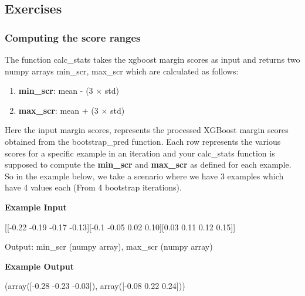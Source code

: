 \documentclass[11pt]{article}
\providecommand{\tightlist}{%
      \setlength{\itemsep}{0pt}\setlength{\parskip}{0pt}}
\newenvironment{Shaded}{}{}
\newcommand{\FloatTok}[1]{\textcolor[rgb]{0.25,0.63,0.44}{{#1}}}
\newcommand{\NormalTok}[1]{{#1}}
\newcommand{\OperatorTok}[1]{\textcolor[rgb]{0.40,0.40,0.40}{{#1}}}
\begin{document}
    \subsection{Exercises}\label{exercises}

    \subsubsection{Computing the score
ranges}\label{computing-the-score-ranges}

The function calc\_stats takes the xgboost margin scores as input and
returns two numpy arrays min\_scr, max\_scr which are calculated as
follows:

\begin{enumerate}
\def\labelenumi{\arabic{enumi}.}
\tightlist
\item
  \textbf{min\_scr}: mean - (3 \(\times\) std)
\item
  \textbf{max\_scr}: mean + (3 \(\times\) std)
\end{enumerate}

Here the input margin scores, represents the processed XGBoost margin
scores obtained from the bootstrap\_pred function. Each row represents
the various scores for a specific example in an iteration and your
calc\_stats function is supposed to compute the \textbf{min\_scr} and
\textbf{max\_scr} as defined for each example. So in the example below,
we take a scenario where we have 3 examples which have 4 values each
(From 4 bootstrap iterations).

\textbf{Example Input}

\begin{Shaded}
\begin{Highlighting}[]
\NormalTok{[[}\OperatorTok{-}\FloatTok{0.22} \OperatorTok{-}\FloatTok{0.19} \OperatorTok{-}\FloatTok{0.17} \OperatorTok{-}\FloatTok{0.13}\NormalTok{][}\OperatorTok{-}\FloatTok{0.1} \OperatorTok{-}\FloatTok{0.05} \FloatTok{0.02} \FloatTok{0.10}\NormalTok{][}\FloatTok{0.03} \FloatTok{0.11} \FloatTok{0.12} \FloatTok{0.15}\NormalTok{]]}
\end{Highlighting}
\end{Shaded}

Output: min\_scr (numpy array), max\_scr (numpy array)

\textbf{Example Output}

\begin{Shaded}
\begin{Highlighting}[]
\NormalTok{(array([}\OperatorTok{-}\FloatTok{0.28} \OperatorTok{-}\FloatTok{0.23} \OperatorTok{-}\FloatTok{0.03}\NormalTok{]),}
\NormalTok{ array([}\OperatorTok{-}\FloatTok{0.08}  \FloatTok{0.22}  \FloatTok{0.24}\NormalTok{]))}
\end{Highlighting}
\end{Shaded}
\end{document}
